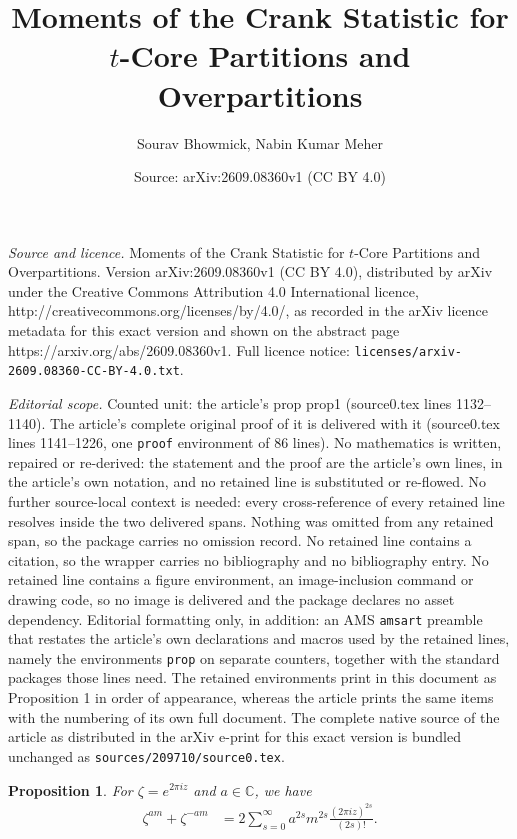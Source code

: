 \documentclass[10pt,a4paper]{amsart}
\title{Moments of the Crank Statistic for $t$-Core Partitions and Overpartitions}
\author{Sourav Bhowmick, Nabin Kumar Meher}
\date{Source: arXiv:2609.08360v1 (CC BY 4.0)}
\newtheorem{prop}{Proposition}
\begin{document}
\maketitle

\noindent\emph{Source and licence.} Moments of the Crank Statistic for $t$-Core Partitions and Overpartitions. Version arXiv:2609.08360v1 (CC BY 4.0), distributed by arXiv under the Creative Commons Attribution 4.0 International licence, http://creativecommons.org/licenses/by/4.0/, as recorded in the arXiv licence metadata for this exact version and shown on the abstract page https://arxiv.org/abs/2609.08360v1. Full licence notice: \texttt{licenses/arxiv-2609.08360-CC-BY-4.0.txt}.\par\smallskip

\noindent\textit{Editorial scope.} Counted unit: the article's prop prop1 (source0.tex lines 1132--1140). The article's complete original proof of it is delivered with it (source0.tex lines 1141--1226, one \texttt{proof} environment of 86 lines). No mathematics is written, repaired or re-derived: the statement and the proof are the article's own lines, in the article's own notation, and no retained line is substituted or re-flowed.  No further source-local context is needed: every cross-reference of every retained line resolves inside the two delivered spans.  Nothing was omitted from any retained span, so the package carries no omission record.  No retained line contains a citation, so the wrapper carries no bibliography and no bibliography entry.  No retained line contains a figure environment, an image-inclusion command or drawing code, so no image is delivered and the package declares no asset dependency.  Editorial formatting only, in addition: an AMS \texttt{amsart} preamble that restates the article's own declarations and macros used by the retained lines, namely the environments \texttt{prop} on separate counters, together with the standard packages those lines need.  The retained environments print in this document as Proposition 1 in order of appearance, whereas the article prints the same items with the numbering of its own full document.  The complete native source of the article as distributed in the arXiv e-print for this exact version is bundled unchanged as \texttt{sources/209710/source0.tex}.
\begin{prop}\label{prop1} For $\zeta=e^{2\pi iz}$ and $ a\in \mathbb{C}$, we have
	\begin{align}
		\zeta^{am}+\zeta^{-am}
		&=
		2\sum_{s=0}^{\infty}
		a^{2s}m^{2s}
		\frac{(2\pi iz)^{2s}}{(2s)!}.
	\end{align} 
\end{prop}
\end{document}
